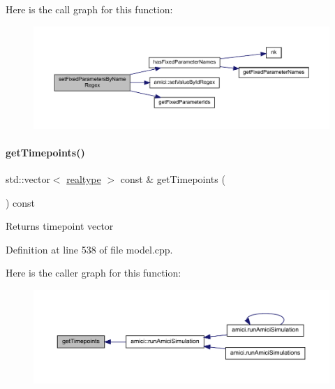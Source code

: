 Here is the call graph for this function\+:
\nopagebreak
\begin{figure}[H]
\begin{center}
\leavevmode
\includegraphics[width=350pt]{classamici_1_1_model_a4802f7d56264e3b592c167da8166cb73_cgraph}
\end{center}
\end{figure}
\mbox{\label{classamici_1_1_model_a50ea5198d117f8f4ad1e34bb279975c8}} 
\paragraph{\texorpdfstring{get\+Timepoints()}{getTimepoints()}}
{\footnotesize\ttfamily std\+::vector$<$ \mbox{\hyperlink{namespaceamici_a1bdce28051d6a53868f7ccbf5f2c14a3}{realtype}} $>$ const  \& get\+Timepoints (\begin{DoxyParamCaption}{ }\end{DoxyParamCaption}) const}

\begin{DoxyReturn}{Returns}
timepoint vector 
\end{DoxyReturn}


Definition at line 538 of file model.\+cpp.

Here is the caller graph for this function\+:
\nopagebreak
\begin{figure}[H]
\begin{center}
\leavevmode
\includegraphics[width=350pt]{classamici_1_1_model_a50ea5198d117f8f4ad1e34bb279975c8_icgraph}
\end{center}
\end{figure}
\mbox{\label{classamici_1_1_model_a50f9642f9bcb883dbd3925c85abc4c24}} 
